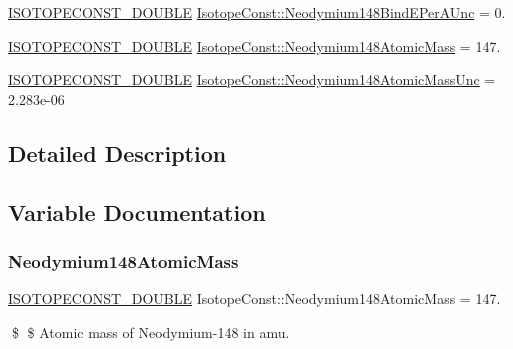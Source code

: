\begin{DoxyCompactItemize}
\mbox{\hyperlink{group___isotope_const-_macros_ga8f45a7272ce02c0b4c65c44636ed719a}{I\+S\+O\+T\+O\+P\+E\+C\+O\+N\+S\+T\+\_\+\+D\+O\+U\+B\+LE}} \mbox{\hyperlink{group___isotope_const-_neodymium-_nd148_ga941077ab26edd8ef8f45f044637dcfcc}{Isotope\+Const\+::\+Neodymium148\+Bind\+E\+Per\+A\+Unc}} = 0.
\item 
\mbox{\hyperlink{group___isotope_const-_macros_ga8f45a7272ce02c0b4c65c44636ed719a}{I\+S\+O\+T\+O\+P\+E\+C\+O\+N\+S\+T\+\_\+\+D\+O\+U\+B\+LE}} \mbox{\hyperlink{group___isotope_const-_neodymium-_nd148_ga17919ab390695b848078ea1ce79d4d5f}{Isotope\+Const\+::\+Neodymium148\+Atomic\+Mass}} = 147.
\item 
\mbox{\hyperlink{group___isotope_const-_macros_ga8f45a7272ce02c0b4c65c44636ed719a}{I\+S\+O\+T\+O\+P\+E\+C\+O\+N\+S\+T\+\_\+\+D\+O\+U\+B\+LE}} \mbox{\hyperlink{group___isotope_const-_neodymium-_nd148_ga16cc4baf3ae2125961a9334b4cc69217}{Isotope\+Const\+::\+Neodymium148\+Atomic\+Mass\+Unc}} = 2.\+283e-\/06
\end{DoxyCompactItemize}


\subsection{Detailed Description}


\subsection{Variable Documentation}
\mbox{\label{group___isotope_const-_neodymium-_nd148_ga17919ab390695b848078ea1ce79d4d5f}} 
\subsubsection{\texorpdfstring{Neodymium148\+Atomic\+Mass}{Neodymium148AtomicMass}}
{\footnotesize\ttfamily \mbox{\hyperlink{group___isotope_const-_macros_ga8f45a7272ce02c0b4c65c44636ed719a}{I\+S\+O\+T\+O\+P\+E\+C\+O\+N\+S\+T\+\_\+\+D\+O\+U\+B\+LE}} Isotope\+Const\+::\+Neodymium148\+Atomic\+Mass = 147.}

\$ \$ Atomic mass of Neodymium-\/148 in amu. \mbox{\label{group___isotope_const-_neodymium-_nd148_ga16cc4baf3ae2125961a9334b4cc69217}} 
